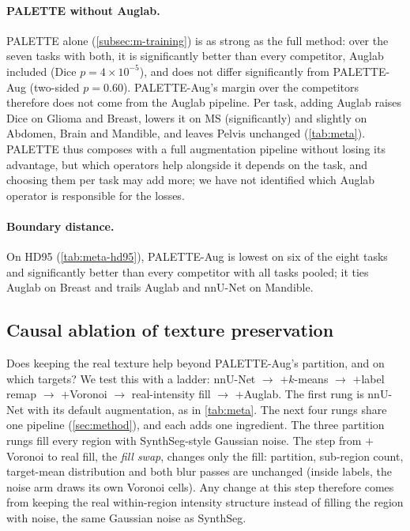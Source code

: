 \paragraph{PALETTE without Auglab.} PALETTE alone
(\cref{subsec:m-training}) is as strong as the full method: over the seven
tasks with both, it is significantly better than every competitor, Auglab
included (Dice $p=4\times10^{-5}$), and does not differ significantly from
PALETTE-Aug (two-sided $p=0.60$). PALETTE-Aug's margin over the competitors
therefore does not come from the Auglab pipeline. Per task, adding Auglab
raises Dice on Glioma and Breast, lowers it on MS (significantly) and slightly
on Abdomen, Brain and Mandible, and leaves Pelvis unchanged (\cref{tab:meta}).
PALETTE thus composes with a full augmentation pipeline without losing its
advantage, but which operators help alongside it depends on the task, and
choosing them per task may add more; we have not identified which Auglab
operator is responsible for the losses.

\paragraph{Boundary distance.} On HD95 (\cref{tab:meta-hd95}), PALETTE-Aug is
lowest on six of the eight tasks and significantly better than every
competitor with all tasks pooled; it ties Auglab on Breast and trails Auglab
and nnU-Net on Mandible.

\subsection{Causal ablation of texture preservation}
\label{subsec:e-ablation}

Does keeping the real texture help beyond PALETTE-Aug's partition, and on
which targets? We test this with a ladder:
nnU-Net $\rightarrow$ $+k$-means $\rightarrow$ $+$label remap $\rightarrow$
$+$Voronoi $\rightarrow$ real-intensity fill $\rightarrow$ $+$Auglab. The
first rung is nnU-Net with its default augmentation, as in \cref{tab:meta}.
The next four rungs share one pipeline (\cref{sec:method}), and each adds one
ingredient. The three partition rungs fill
every region with SynthSeg-style Gaussian noise. The
step from $+$Voronoi to real fill, the \emph{fill swap}, changes only the fill:
partition, sub-region count, target-mean distribution and both blur passes are
unchanged (inside labels, the noise arm draws its own Voronoi cells). Any change at this step therefore comes from keeping the real
within-region intensity structure instead of filling the region with noise,
the same Gaussian noise as SynthSeg.

